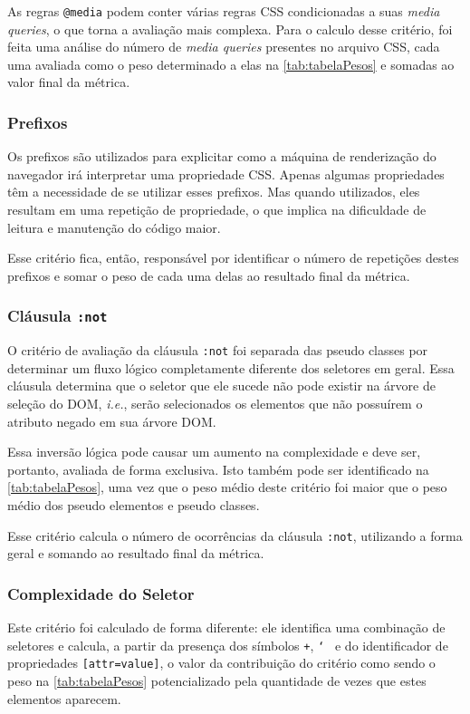 As regras \texttt{@media} podem conter várias regras CSS condicionadas a suas \textit{media queries}, o que torna a avaliação mais complexa. Para o calculo desse critério, foi feita uma análise do número de \textit{media queries} presentes no arquivo CSS, cada uma avaliada como o peso determinado a elas na \autoref{tab:tabelaPesos} e somadas ao valor final da métrica.

\subsubsection{Prefixos}
Os prefixos são utilizados para explicitar como a máquina de renderização do navegador irá interpretar uma propriedade CSS. Apenas algumas propriedades têm a necessidade de se utilizar esses prefixos. Mas quando utilizados, eles resultam em uma repetição de propriedade, o que implica na dificuldade de leitura e manutenção do código maior.

Esse critério fica, então, responsável por identificar o número de repetições destes prefixos e somar o peso de cada uma delas ao resultado final da métrica.

\subsubsection{Cláusula \texttt{:not}}
O critério de avaliação da cláusula \texttt{:not} foi separada das pseudo classes por determinar um fluxo lógico completamente diferente dos seletores em geral. Essa cláusula determina que o seletor que ele sucede não pode existir na árvore de seleção do DOM, \textit{i.e.}, serão selecionados os elementos que não possuírem o atributo negado em sua árvore DOM.

Essa inversão lógica pode causar um aumento na complexidade e deve ser, portanto, avaliada de forma exclusiva. Isto também pode ser identificado na \autoref{tab:tabelaPesos}, uma vez que o peso médio deste critério foi maior que o peso médio dos pseudo elementos e pseudo classes.

Esse critério calcula o número de ocorrências da cláusula \texttt{:not}, utilizando a forma geral e somando ao resultado final da métrica.

\subsubsection{Complexidade do Seletor}
Este critério foi calculado de forma diferente: ele identifica uma combinação de seletores e calcula, a partir da presença dos símbolos \texttt{+}, \texttt{\char`~} e do identificador de propriedades \texttt{[attr=value]}, o valor da contribuição do critério como sendo o peso na \autoref{tab:tabelaPesos} potencializado pela quantidade de vezes que estes elementos aparecem.

